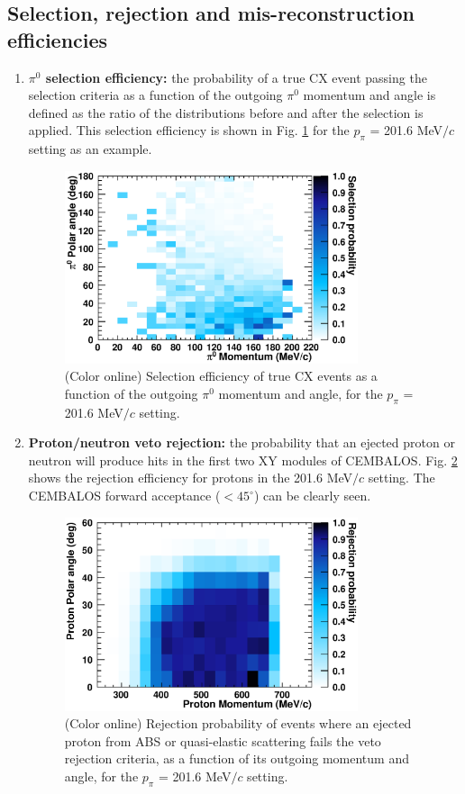 \subsection{Selection, rejection and mis-reconstruction efficiencies}\label{sec:efficiencies}

\begin{enumerate}
\item{{\bf $\pi^0$ selection efficiency:} the probability of a true CX event passing the selection criteria as a function of the outgoing $\pi^0$ momentum and angle is defined as the ratio of the distributions before and after the selection is applied. This selection efficiency is shown in Fig. \ref{fig:pi0_selection} for the $p_{\pi}$ = 201.6 MeV$/c$ setting as an example.}

\begin{figure}[h]
 \includegraphics[width=86mm]{figures/Pi0SelectionEfficiency_200.eps}
 \caption{(Color online) Selection efficiency of true CX events as a function of the outgoing $\pi^{0}$ momentum and angle, for the $p_{\pi}$ = 201.6 MeV$/c$ setting.}
 \label{fig:pi0_selection}
\end{figure}

\item{{\bf Proton/neutron veto rejection:} the probability that an ejected proton or neutron will produce hits in the first two XY modules of CEMBALOS. Fig. \ref{fig:proton_rejection} shows the rejection efficiency for protons in the 201.6 MeV$/c$ setting. The CEMBALOS forward acceptance ($<45^{\circ}$) can be clearly seen.}

\begin{figure}[h]
 \includegraphics[width=86mm]{figures/ProtonRejectionEfficiency_200.eps}
 \caption{(Color online) Rejection probability of events where an ejected proton from ABS or quasi-elastic scattering fails the veto rejection criteria, as a function of its outgoing  momentum and angle, for the $p_{\pi}$ = 201.6 MeV$/c$ setting.}
 \label{fig:proton_rejection}
\end{figure}


\end{enumerate}
